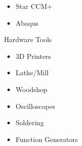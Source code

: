 \begin{minipage}{\dimexpr\textwidth-2ex}
\begin{multicols}{5}
\begin{itemize}[topsep=3pt,label=\textcolor{blue}{\textbullet},leftmargin=*]
        \item Star CCM+
        \item Abaqus
    \end{itemize}
    \columnbreak
    {\color{cblue} Hardware Tools}
    \begin{itemize}[topsep=3pt,label=\textcolor{blue}{\textbullet},leftmargin=*]
        \itemsep-0.2em 
        \item 3D Printers
        \item Lathe/Mill
        \item Woodshop
        \item Oscilloscopes
        \item Soldering
        \item Function Generators
    \end{itemize}

\end{multicols}


\end{minipage}